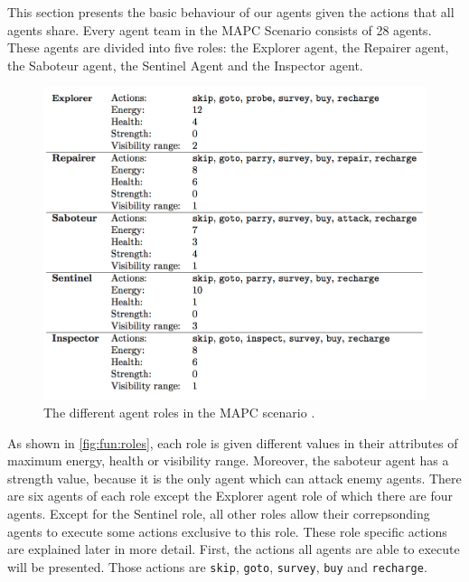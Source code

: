 This section presents the basic behaviour of our agents given the actions that all agents share.
Every agent team in the MAPC Scenario consists of 28 agents.
These agents are divided into five roles: the Explorer agent, the Repairer agent, the Saboteur agent, the Sentinel Agent and the Inspector agent.
\begin{figure}[ht]
  \centering
  \includegraphics[width=0.9\linewidth]{images/roles.png}
  \caption{The different agent roles in the MAPC scenario \cite{ahlbrecht_mapc_2014}.}
  \label{fig:fun:roles}
\end{figure}
As shown in \autoref{fig:fun:roles}, each role is given different values in their attributes of maximum energy, health or visibility range.
Moreover, the saboteur agent has a strength value, because it is the only agent which can attack enemy agents.
There are six agents of each role except the Explorer agent role of which there are four agents.
Except for the Sentinel role, all other roles allow their correpsonding agents to execute some actions exclusive to this role.
These role specific actions are explained later in more detail.
First, the actions all agents are able to execute will be presented.
Those actions are \texttt{skip}, \texttt{goto}, \texttt{survey}, \texttt{buy} and \texttt{recharge}.
